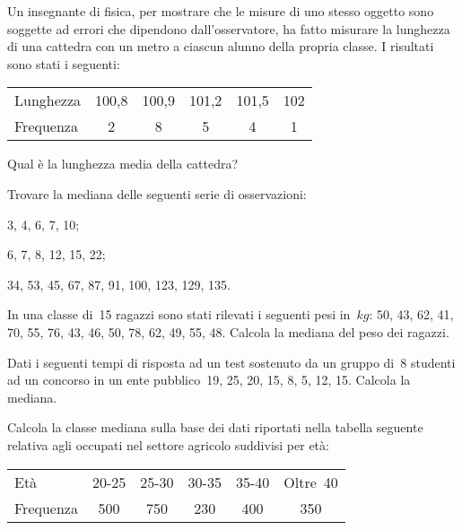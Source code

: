 \begin{esercizio}
\label{ese:A.29}
Un insegnante di fisica, per mostrare che le misure di uno stesso oggetto sono soggette ad errori che dipendono dall'osservatore,
ha fatto misurare la lunghezza di una cattedra con un metro a ciascun alunno della propria classe. I risultati sono stati i seguenti:
\begin{center}
 \begin{tabular}{l*{5}{c}}
\toprule
Lunghezza & 100,8 & 100,9 & 101,2 & 101,5 & 102\\
Frequenza & 2 & 8 & 5 & 4 & 1\\
\bottomrule
\end{tabular}
\end{center}
Qual è la lunghezza media della cattedra?
\end{esercizio}

\begin{esercizio}[\Ast]
\label{ese:A.30}
Trovare la mediana delle seguenti serie di osservazioni:
\begin{multicols}{2}
\begin{enumeratea}
 \item 3, 4, 6, 7, 10;
 \item 6, 7, 8, 12, 15, 22;
 \item 34, 53, 45, 67, 87, 91, 100, 123, 129, 135.
\end{enumeratea}
\end{multicols}
\end{esercizio}

\begin{esercizio}[\Ast]
\label{ese:A.31}
In una classe di~15 ragazzi sono stati rilevati i seguenti pesi in~$\unit{kg}$:
50, 43, 62, 41, 70, 55, 76, 43, 46, 50, 78, 62, 49, 55, 48.
Calcola la mediana del peso dei ragazzi.
\end{esercizio}

\begin{esercizio}[\Ast]
\label{ese:A.32}
Dati i seguenti tempi di risposta ad un test sostenuto da un gruppo di~8 studenti ad un concorso
in un ente pubblico~19, 25, 20, 15, 8, 5, 12, 15. Calcola la mediana.
\end{esercizio}

\begin{esercizio}
\label{ese:A.33}
Calcola la classe mediana sulla base dei dati riportati nella tabella seguente relativa agli occupati nel settore agricolo suddivisi per età:
\begin{center}
 \begin{tabular}{l*{5}{c}}
\toprule
Età & 20-25 & 25-30 & 30-35 & 35-40 & Oltre~40\\
Frequenza & 500 & 750 & 230 & 400 & 350\\
\bottomrule
\end{tabular}
\end{center}
\end{esercizio}

